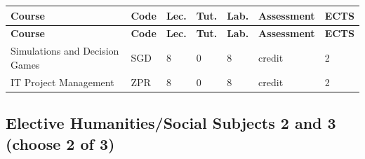 \documentclass[12pt,a4paper]{article}
\newcommand{\thdrule}{\noalign{\global\setlength{\extrarowheight}{0pt}}}
\newcommand{\thdend}{\noalign{\global\setlength{\extrarowheight}{4pt}}}
\begin{document}
{\scriptsize
\begin{longtable}{m{5.5cm}m{0.8cm}m{1cm}m{1cm}m{1cm}m{1.7cm}m{0.7cm}}
\thdrule\toprule
\rowcolor{pjatkRed}
{\color{white}\footnotesize\textbf{\vphantom{Ag}Course}} & {\color{white}\footnotesize\textbf{\vphantom{Ag}Code}} & {\color{white}\footnotesize\textbf{\vphantom{Ag}Lec.}} & {\color{white}\footnotesize\textbf{\vphantom{Ag}Tut.}} & {\color{white}\footnotesize\textbf{\vphantom{Ag}Lab.}} & {\color{white}\footnotesize\textbf{\vphantom{Ag}Assessment}} & {\color{white}\footnotesize\textbf{\vphantom{Ag}ECTS}} \\
\midrule\thdend
\endfirsthead
\thdrule\toprule
\rowcolor{pjatkRed}
{\color{white}\footnotesize\textbf{\vphantom{Ag}Course}} & {\color{white}\footnotesize\textbf{\vphantom{Ag}Code}} & {\color{white}\footnotesize\textbf{\vphantom{Ag}Lec.}} & {\color{white}\footnotesize\textbf{\vphantom{Ag}Tut.}} & {\color{white}\footnotesize\textbf{\vphantom{Ag}Lab.}} & {\color{white}\footnotesize\textbf{\vphantom{Ag}Assessment}} & {\color{white}\footnotesize\textbf{\vphantom{Ag}ECTS}} \\
\midrule\thdend
\endhead
\rowcolor{tableRowLight} Simulations and Decision Games & SGD & 8 & 0 & 8 & {\scriptsize credit} & 2 \\
\rowcolor{tableRowAlt} IT Project Management & ZPR & 8 & 0 & 8 & {\scriptsize credit} & 2 \\
\bottomrule
\end{longtable}}

\subsection*{Elective Humanities/Social Subjects 2 and 3 (choose 2 of 3)}
\end{document}
